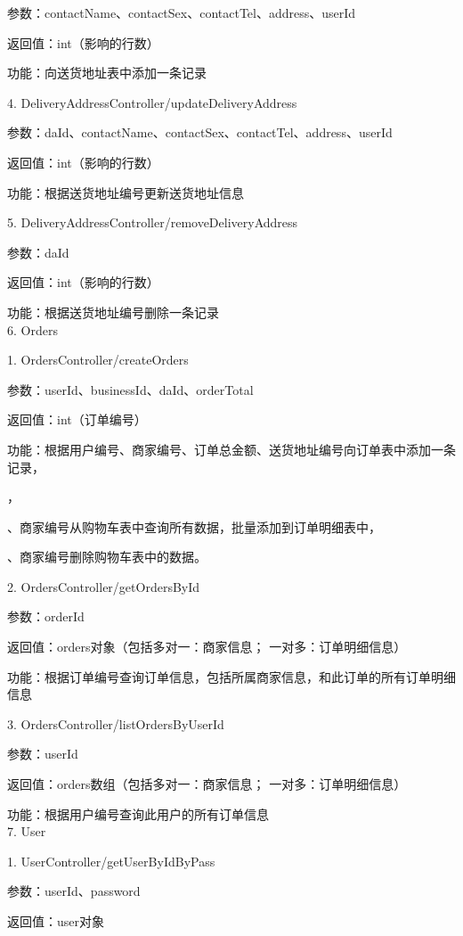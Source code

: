 参数：contactName、contactSex、contactTel、address、userId 

返回值：int（影响的行数）

功能：向送货地址表中添加一条记录

4. DeliveryAddressController/updateDeliveryAddress

参数：daId、contactName、contactSex、contactTel、address、userId

返回值：int（影响的行数）

功能：根据送货地址编号更新送货地址信息

5. DeliveryAddressController/removeDeliveryAddress 

参数：daId 

返回值：int（影响的行数）

功能：根据送货地址编号删除一条记录~\\

6. Orders

1. OrdersController/createOrders 

参数：userId、businessId、daId、orderTotal 

返回值：int（订单编号）

功能：根据用户编号、商家编号、订单总金额、送货地址编号向订单表中添加一条记录，

\qquad{}，

\qquad{}、商家编号从购物车表中查询所有数据，批量添加到订单明细表中，

\qquad{}、商家编号删除购物车表中的数据。

2. OrdersController/getOrdersById 

参数：orderId 

返回值：orders对象（包括多对一：商家信息； 一对多：订单明细信息）

功能：根据订单编号查询订单信息，包括所属商家信息，和此订单的所有订单明细信息

3. OrdersController/listOrdersByUserId 

参数：userId 

返回值：orders数组（包括多对一：商家信息； 一对多：订单明细信息）

功能：根据用户编号查询此用户的所有订单信息~\\

7. User

1. UserController/getUserByIdByPass 

参数：userId、password 

返回值：user对象

